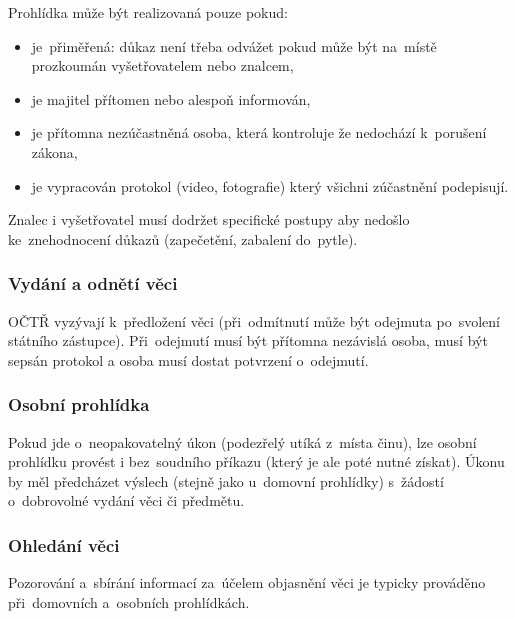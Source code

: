 Prohlídka může být realizovaná pouze pokud:
\vspace*{-1em}\begin{itemize}
\item je~přiměřená: důkaz není třeba odvážet pokud může být na~místě prozkoumán vyšetřovatelem nebo znalcem,
\item je majitel přítomen nebo alespoň informován,
\item je přítomna nezúčastněná osoba, která kontroluje že nedochází k~porušení zákona,
\item je vypracován protokol (video, fotografie) který všichni zúčastnění podepisují.
\end{itemize}

Znalec i vyšetřovatel musí dodržet specifické postupy aby nedošlo ke~znehodnocení důkazů (zapečetění, zabalení do~pytle).

\subsubsection{Vydání a odnětí věci}

OČTŘ vyzývají k~předložení věci (při~odmítnutí může být odejmuta po~svolení státního zástupce).
Při~odejmutí musí být přítomna nezávislá osoba, musí být sepsán protokol a osoba musí dostat potvrzení o~odejmutí.


\subsubsection{Osobní prohlídka}

Pokud jde o~neopakovatelný úkon (podezřelý utíká z~místa činu), lze osobní prohlídku provést i bez~soudního příkazu (který je ale poté nutné získat).
Úkonu by měl předcházet výslech (stejně jako u~domovní prohlídky) s~žádostí o~dobrovolné vydání věci či předmětu.


\subsubsection{Ohledání věci}

Pozorování a~sbírání informací za~účelem objasnění věci je typicky prováděno při~domovních a~osobních prohlídkách.

